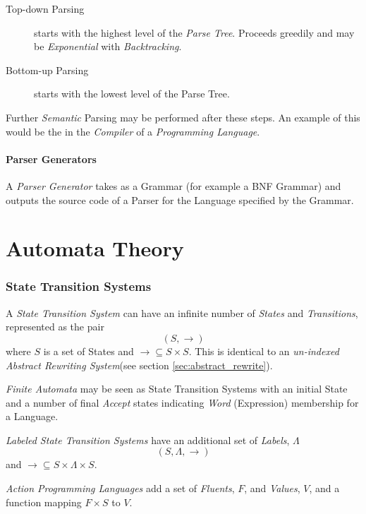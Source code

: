 \documentclass{article}
\begin{document}
\begin{description}
    \item[Top-down Parsing]
    starts with the highest level of the \emph{Parse Tree}. Proceeds greedily
    and may be \emph{Exponential} with \emph{Backtracking}.
    \item[Bottom-up Parsing]
    starts with the lowest level of the Parse Tree.
\end{description}

Further \emph{Semantic} Parsing may be performed after these steps. An
example of this would be the in the \emph{Compiler} of a
\emph{Programming Language}.

\subsection{Parser Generators}\label{subsec:parser_generator}

A \emph{Parser Generator} takes as a Grammar (for example a BNF
Grammar) and outputs the source code of a Parser for the Language
specified by the Grammar.

\part{Automata Theory}

\section{State Transition Systems} \label{sec:state_transition_system}
A \emph{State Transition System} can have an infinite number of
\emph{States} and \emph{Transitions}, represented as the pair
\[
    (S,\rightarrow)
\]
where $S$ is a set of States and $\rightarrow \subseteq S \times
S$. This is identical to an \emph{un-indexed Abstract Rewriting
  System}(see section \ref{sec:abstract_rewrite}).

\emph{Finite Automata} may be seen as State Transition Systems with an
initial State and a number of final \emph{Accept} states indicating
\emph{Word} (Expression) membership for a Language.

\emph{Labeled State Transition Systems} have an additional set of
\emph{Labels}, $\Lambda$
\[(S,\Lambda,\rightarrow)\]
and $\rightarrow \subseteq S \times \Lambda \times S$.

\emph{Action Programming Languages} add a set of \emph{Fluents}, $F$, and
\emph{Values}, $V$, and a function mapping $F \times S$ to $V$.
\end{document}
